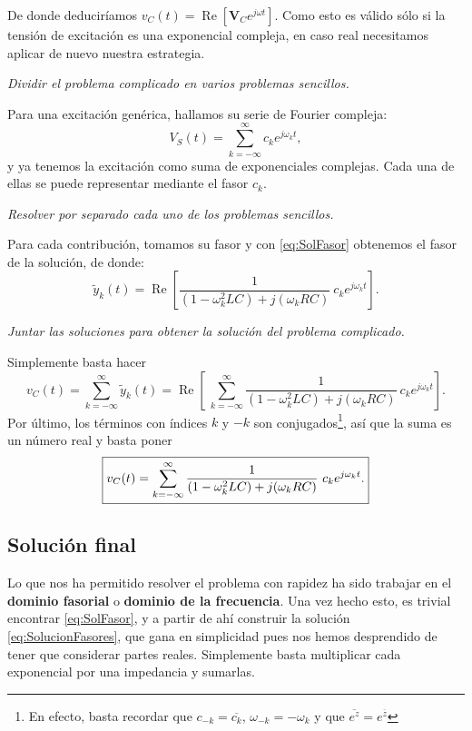 De donde deduciríamos $v_C(t) = \operatorname{Re} \left[\mathbf{V}_C e^{j\omega t}\right]$. Como esto es válido sólo si la tensión de excitación es una exponencial compleja, en caso real necesitamos aplicar de nuevo nuestra estrategia.

\begin{enumerate}[{\bfseries [1]}]
  \item\textit{\color{blue} Dividir el problema complicado en varios problemas sencillos.}

    Para una excitación genérica, hallamos su serie de Fourier compleja:
    \[
    V_S(t) = \sum_{k=-\infty}^\infty c_k e^{j\omega_k t},
    \]
    y ya tenemos la excitación como suma de exponenciales complejas. Cada una de ellas se puede representar mediante el fasor $c_k$.
  \item \textit{\color{blue}Resolver por separado cada uno de los problemas sencillos.}

    Para cada contribución, tomamos su fasor y con \eqref{eq:SolFasor} obtenemos el fasor de la solución, de donde:
    \[\boxed{
      \tilde{y}_k (t)= \operatorname{Re}\left[\frac{1}{(1-\omega_k^2 LC) + j(\omega_k RC)}\ c_k e^{j\omega_k t}\right].
    }\]
  \item \textit{\color{blue}Juntar las soluciones para obtener la solución del problema complicado.}

    Simplemente basta hacer
    \[
    v_C(t) =  \sum_{k=-\infty}^\infty \tilde{y}_k(t) = \operatorname{Re}\left[\ \sum_{k=-\infty}^\infty \frac{1}{(1-\omega_k^2 LC) + j(\omega_k RC)}\ c_k e^{j\omega_k t}  \right].
    \] 
    Por último, los términos con índices $k$ y $-k$ son conjugados\footnote{En efecto, basta recordar que $c_{-k} = \overline{c_k}$, $\omega_{-k}=-\omega_k$ y que $\overline{e^z}=e^{\overline{z}}$}, así que la suma es un número real y basta poner
    \begin{equation} \boxed{
      \label{eq:SolucionFasores}
      v_C(t) = \sum_{k=-\infty}^\infty \frac{1}{(1-\omega_k^2 LC) + j(\omega_k RC)}\ c_k e^{j\omega_k t}.
    } \end{equation}
\end{enumerate}




\subsection{Solución final}
Lo que nos ha permitido resolver el problema con rapidez ha sido trabajar en el \textbf{dominio fasorial} o \textbf{dominio de la frecuencia}. Una vez hecho esto, es trivial encontrar \eqref{eq:SolFasor}, y a partir de ahí construir la solución \eqref{eq:SolucionFasores}, que gana en simplicidad pues nos hemos desprendido de tener que considerar partes reales. Simplemente basta multiplicar cada exponencial por una impedancia y sumarlas.

